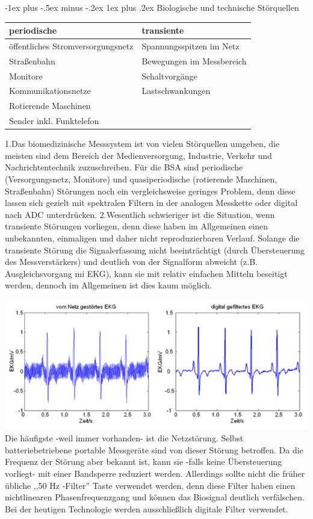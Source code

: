 \documentclass[a4paper]{article}
\makeatletter
\renewcommand{\subsubsection}{\@startsection{subsubsection}{3}{0mm}%
 {-1ex plus -.5ex minus -.2ex}%
 {1ex plus .2ex}%
 {\normalfont\small\bfseries}}
\makeatother
\begin{document}
\begin{multicols}{3}
  \subsubsection{Biologische und technische Störquellen}\label{biologische-und-technische-stuxf6rquellen}

  \begin{tabular}{l|l}
    periodische                       & transiente                \\\hline
    öffentliches Stromversorgungsnetz & Spannungsspitzen im Netz  \\
    Straßenbahn                       & Bewegungen im Messbereich \\
    Monitore                          & Schaltvorgänge            \\
    Kommunikationsnetze               & Lastschwankungen          \\
    Rotierende Maschinen              &                           \\
    Sender inkl. Funktelefon          &                           \\
  \end{tabular}

  1.Das biomedizinische Messsystem ist von vielen Störquellen umgeben, die
  meisten sind dem Bereich der Medienversorgung, Industrie, Verkehr und
  Nachrichtentechnik zuzuschreiben. Für die BSA sind periodische
  (Versorgungsnetz, Monitore) und quasiperiodische (rotierende Maschinen,
  Straßenbahn) Störungen noch ein vergleichsweise geringes Problem, denn
  diese lassen sich gezielt mit spektralen Filtern in der analogen
  Messkette oder digital nach ADC unterdrücken. 2.Wesentlich schwieriger
  ist die Situation, wenn transiente Störungen vorliegen, denn diese haben
  im Allgemeinen einen unbekannten, einmaligen und daher nicht
  reproduzierbaren Verlauf. Solange die transiente Störung die
  Signalerfassung nicht beeinträchtigt (durch Übersteuerung des
  Messverstärkers) und deutlich von der Signalform abweicht (z.B.
  Ausgleichsvorgang mi EKG), kann sie mit relativ einfachen Mitteln
  beseitigt werden, dennoch im Allgemeinen ist dies kaum möglich.

  \includegraphics[width=.5\linewidth]{Assets/Biosignalverarbeitung-netzfrequenz-bandsperre.png}
  Die häufigste -weil immer vorhanden- ist die Netzstörung. Selbst
  batteriebetriebene portable Messgeräte sind von dieser Störung
  betroffen. Da die Frequenz der Störung aber bekannt ist, kann sie -falls
  keine Übersteuerung vorliegt- mit einer Bandsperre reduziert werden.
  Allerdings sollte nicht die früher übliche ,,50 Hz -Filter'' Taste
  verwendet werden, denn diese Filter haben einen nichtlinearen
  Phasenfrequenzgang und können das Biosignal deutlich verfälschen. Bei
  der heutigen Technologie werden ausschließlich digitale Filter
  verwendet.


\end{multicols}
\end{document}
